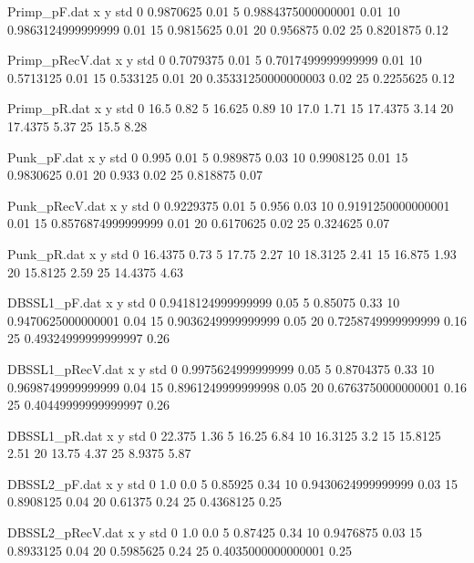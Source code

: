 \begin{filecontents}{Primp_pF.dat}
x y std
0 0.9870625 0.01
5 0.9884375000000001 0.01
10 0.9863124999999999 0.01
15 0.9815625 0.01
20 0.956875 0.02
25 0.8201875 0.12
\end{filecontents}
\begin{filecontents}{Primp_pRecV.dat}
x y std
0 0.7079375 0.01
5 0.7017499999999999 0.01
10 0.5713125 0.01
15 0.533125 0.01
20 0.35331250000000003 0.02
25 0.2255625 0.12
\end{filecontents}
\begin{filecontents}{Primp_pR.dat}
x y std
0 16.5 0.82
5 16.625 0.89
10 17.0 1.71
15 17.4375 3.14
20 17.4375 5.37
25 15.5 8.28
\end{filecontents}
\begin{filecontents}{Punk_pF.dat}
x y std
0 0.995 0.01
5 0.989875 0.03
10 0.9908125 0.01
15 0.9830625 0.01
20 0.933 0.02
25 0.818875 0.07
\end{filecontents}
\begin{filecontents}{Punk_pRecV.dat}
x y std
0 0.9229375 0.01
5 0.956 0.03
10 0.9191250000000001 0.01
15 0.8576874999999999 0.01
20 0.6170625 0.02
25 0.324625 0.07
\end{filecontents}
\begin{filecontents}{Punk_pR.dat}
x y std
0 16.4375 0.73
5 17.75 2.27
10 18.3125 2.41
15 16.875 1.93
20 15.8125 2.59
25 14.4375 4.63
\end{filecontents}
\begin{filecontents}{DBSSL1_pF.dat}
x y std
0 0.9418124999999999 0.05
5 0.85075 0.33
10 0.9470625000000001 0.04
15 0.9036249999999999 0.05
20 0.7258749999999999 0.16
25 0.49324999999999997 0.26
\end{filecontents}
\begin{filecontents}{DBSSL1_pRecV.dat}
x y std
0 0.9975624999999999 0.05
5 0.8704375 0.33
10 0.9698749999999999 0.04
15 0.8961249999999998 0.05
20 0.6763750000000001 0.16
25 0.40449999999999997 0.26
\end{filecontents}
\begin{filecontents}{DBSSL1_pR.dat}
x y std
0 22.375 1.36
5 16.25 6.84
10 16.3125 3.2
15 15.8125 2.51
20 13.75 4.37
25 8.9375 5.87
\end{filecontents}
\begin{filecontents}{DBSSL2_pF.dat}
x y std
0 1.0 0.0
5 0.85925 0.34
10 0.9430624999999999 0.03
15 0.8908125 0.04
20 0.61375 0.24
25 0.4368125 0.25
\end{filecontents}
\begin{filecontents}{DBSSL2_pRecV.dat}
x y std
0 1.0 0.0
5 0.87425 0.34
10 0.9476875 0.03
15 0.8933125 0.04
20 0.5985625 0.24
25 0.4035000000000001 0.25
\end{filecontents}
